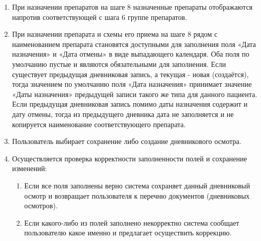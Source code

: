 \documentclass[a4paper,8pt]{report} %
\begin{document}
{\begin{enumerate}
              Доступные по умолчанию, т.е. такие, которые отображаются в выпадающем списке,
              препараты для группы \textbf{«Противогрибковые»}: Амбизом, Амфолип, Вифенд, Кансидас,
              Микамин, Ноксафил, Флюконазол, Дифлюкан,Микосист, Эраксис.
              Доступные по умолчанию в группе \textbf{«Антимикробные»}: Амикацин, Амоксициллина
              клавуланат, Аугментин, Амоксиклав, Бисептол, Ванкомицин, Эдицин, Дориппрекс,
              Зивокс, Зиннат, Изониазид, Кларитро/Азитромицин, Клиндамицин, Колистин,
              Максипим, Меронем, Метронидазол, Флагил, Метроджил, Панцеф, Роцефин,
              Сульперазон, Тазоцин, Тиенам, Фортум, Фторхинолоны.

              Доступные по умолчанию в группе \textbf{«Противовирусные»}: Зовиракс, Ацикловир,
              Цимевен.

              Помимо этого в каждом списке доступен выбор препарата «Другое» (в самом конце
              списка).

              Если выбран «Другое», тогда пользователю необходимо отобразить поле для ввода
              текста. Значение по умолчанию - пустое. Комметарий к полю - «Введите наименование
              препарата». Допускается пустое значение при сохранении.

              \item При назначении препаратов на шаге 8 назначенные препараты отображаются напротив
              соответствующей с шага 6 группе препаратов.
              \item При назначении препарата и схемы его приема на шаге 8 рядом с наименованием
              препарата становятся доступными для заполнения поля «Дата назначения» и «Дата
              отмены» в виде выпадающего календаря. Оба поля по умолчанию пустые и являются
              обязательными для заполнения.
              Если существует предыдущая дневниковая запись, а текущая - новая (создаётся),
              тогда значением по умолчанию поля «Дата назначения» принимает значение «Даты
              назначения» предыдущей записи такого же типа для данного пациента.
              Если предыдущая дневниковая запись помимо даты назначения содержит и дату
              отмены, тогда из предыдущего дневника дата не заполняется и не копируется
              наименование соответствующего препарата.
              \item Пользователь выбирает сохранение либо создание дневникового осмотра.
              \item Осуществляется проверка корректности заполненности полей и сохранение
              изменений:
              \begin{enumerate}[label*=\arabic*.]
                \item Если все поля заполнены верно система сохраняет данный дневниковый осмотр и
                возвращает пользователя к перечню документов (дневниковых осмотров).
                \item Если какого-либо из полей заполнено некорректно система сообщает пользователю
                какое именно и предлагает осуществить коррекцию.
              \end{enumerate}
           \end{enumerate}
}
\end{document}
